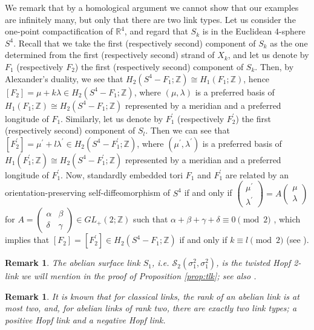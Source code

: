 \documentclass[a4paper,11pt]{amsart}
\numberwithin{equation}{section}
\newtheorem{remark}[theorem]{Remark}
\newenvironment{rem}{\begin{remark}\rm}{\end{remark}}
\begin{document}
We remark that by a homological argument we cannot show that our examples are infinitely many, but only that there are two link types. Let us consider the one-point compactification of $\mathbb{R}^4$, and regard that $S_k$ is in the Euclidean 4-sphere $S^4$. Recall that we take the first (respectively second) component of $S_k$ as the one determined from the first (respectively second) strand of $X_k$, and let us denote by $F_1$ (respectively $F_2$) the first (respectively second) component of $S_k$. 
Then, by Alexander's duality, we see that $H_2(S^4-F_1; \mathbb{Z})\cong H_1(F_1; \mathbb{Z})$, hence $[F_2]=\mu+k\lambda\in H_2(S^4-F_1; \mathbb{Z})$, where $(\mu, \lambda)$ is a preferred basis of $H_1(F_1; \mathbb{Z}) \cong H_2(S^4-F_1; \mathbb{Z})$ represented by a meridian and a preferred longitude of $F_1$. 
Similarly, let us denote by $F_1^\prime$ (respectively $F_2^\prime$) the first (respectively second) component of $S_l$. Then we can see that $[F_2^\prime]=\mu^\prime+l\lambda^\prime\in H_2(S^4-F_1^\prime; \mathbb{Z})$, where $(\mu^\prime, \lambda^\prime)$ is a preferred basis of $H_1(F_1^\prime; \mathbb{Z}) \cong H_2(S^4-F_1^\prime; \mathbb{Z})$  represented by a meridian and a preferred longitude of $F_1^\prime$. 
Now, standardly embedded tori $F_1$ and $F_1^\prime$ are related by an orientation-preserving self-diffeomorphism of $S^4$ if and only if $\begin{pmatrix} \mu^\prime \\ \lambda^\prime \end{pmatrix}=A\begin{pmatrix} \mu \\ \lambda \end{pmatrix}$ for $A=\begin{pmatrix} \alpha & \beta\\
\delta & \gamma \end{pmatrix} \in GL_+(2; \mathbb{Z})$ such that $\alpha+\beta+\gamma+\delta\equiv 0 \pmod{2}$ \cite{Montesinos}, which implies that $[F_2]=[F_2^\prime] \in  H_2(S^4-F_1; \mathbb{Z})$ if and only if $k\equiv l \pmod{2}$ (see \cite{Iwase}). 

\begin{rem}\label{rem0211}
The abelian surface link $S_1$, i.e. $\mathcal{S}_2(\sigma_1^2, \sigma_1^2)$, is the twisted Hopf 2-link we will mention in the proof of Proposition \ref{prop:tlk}; see also \cite{CKSS01}. 
\end{rem}

\begin{rem}\label{rem0214}
It is known \cite[Theorem 6.3.1--Exercise 6.3.3]{Kawauchi} that for classical links, the rank of an abelian link is at most two, and, for abelian links of rank two, there are exactly two link types; a positive Hopf link and a negative Hopf link. 
\end{rem}
\end{document}
